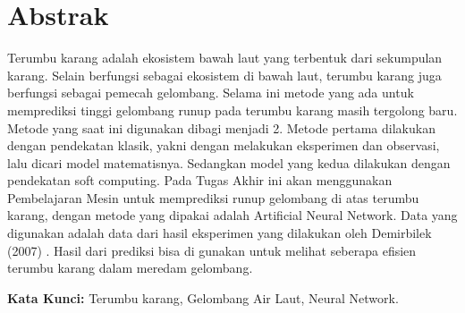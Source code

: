 \chapter*{Abstrak}
Terumbu karang adalah ekosistem bawah laut yang terbentuk dari sekumpulan karang. Selain berfungsi sebagai ekosistem di bawah laut, terumbu karang juga berfungsi sebagai pemecah gelombang. Selama ini metode yang ada untuk memprediksi tinggi gelombang runup pada terumbu karang masih tergolong baru. Metode yang saat ini digunakan dibagi menjadi 2. Metode pertama dilakukan dengan pendekatan klasik, yakni dengan melakukan eksperimen dan observasi, lalu dicari model matematisnya. Sedangkan model yang kedua dilakukan dengan pendekatan soft computing. Pada Tugas Akhir ini akan menggunakan Pembelajaran Mesin untuk memprediksi runup gelombang di atas terumbu karang, dengan metode yang dipakai adalah Artificial Neural Network. Data yang digunakan adalah data dari hasil eksperimen yang dilakukan oleh Demirbilek (2007) \cite{DemirbilekReport}. Hasil dari prediksi bisa di gunakan untuk melihat seberapa efisien terumbu karang dalam meredam gelombang.
\vspace{0.5 cm}
\begin{flushleft}
{\textbf{Kata Kunci:} Terumbu karang, Gelombang Air Laut, Neural Network.}
\end{flushleft}
